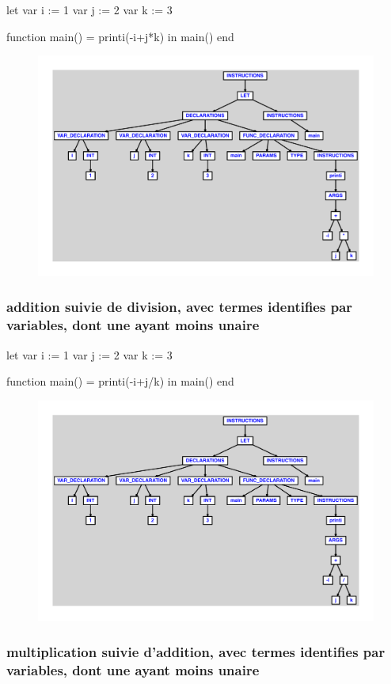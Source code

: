 \documentclass{article}
\begin{document}
\begin{verbatimtab}
let
	var i := 1
	var j := 2
	var k := 3

	function main() = printi(-i+j*k)
in main() end
\end{verbatimtab}
\begin{figure}[H]\centering\includegraphics[max width=\textwidth]{ast/ast_81.pdf}\end{figure}\subsubsection{addition suivie de division, avec termes identifies par variables, dont une ayant moins unaire}
\begin{verbatimtab}
let
	var i := 1
	var j := 2
	var k := 3

	function main() = printi(-i+j/k)
in main() end
\end{verbatimtab}
\begin{figure}[H]\centering\includegraphics[max width=\textwidth]{ast/ast_82.pdf}\end{figure}\subsubsection{multiplication suivie d'addition, avec termes identifies par variables, dont une ayant moins unaire}
\end{document}
